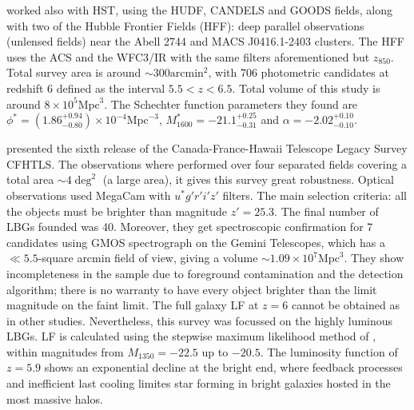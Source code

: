 \documentclass{emulateapj}
\begin{document}
\citet{finkelstein14} worked also with HST, using the HUDF, CANDELS and GOODS fields, 
along with two of the Hubble Frontier Fields (HFF): deep parallel observations (unlensed 
fields) near the Abell 2744 and MACS J0416.1-2403 clusters. The HFF uses the ACS and 
the WFC3/IR with the same filters aforementioned but $z_{850}$. Total survey area is around 
$\sim300\textrm{arcmin}^2$, with 706 photometric candidates at redshift 6 defined as the interval $5.5<z<6.5$. 
Total volume of this study is around $ 8 \times 10^5 \textrm{Mpc}^3$. The Schechter function parameters they found are $\phi^* =(1.86_{-0.80}^{+0.94}) \times 10 ^{-4}  \textrm{Mpc}^{-3} $, 
$M^*_{1600} = -21.1_{-0.31}^{+0.25}$ and $\alpha = -2.02_{-0.10}^{+0.10}$. 



\citet{willott13} presented the sixth release of the Canada-France-Hawaii 
Telescope Legacy Survey CFHTLS. The observations where performed over four 
separated fields covering a total area $\sim 4 \deg^2$ (a large area), it gives this 
survey great robustness. Optical observations used MegaCam  %
with $u^* g' r' i' z'$ filters. The main selection criteria: all the 
objects must be brighter than magnitude $z' = 25.3$. The final 
number of LBGs founded was 40. Moreover, they get spectroscopic confirmation 
for 7 candidates using GMOS spectrograph on the Gemini Telescopes, which 
has a $\ll 5.5$-square arcmin field of view, giving a volume $\sim 1.09 \times 10^7 \textrm{Mpc}^3$. 
They show incompleteness in the sample due to 
foreground contamination and the detection algorithm; there is no warranty to 
have every object brighter than the limit magnitude on the faint limit. The full 
galaxy LF at $z=6$ cannot be obtained as in other studies. Nevertheless, this survey 
was focussed on the highly luminous LBGs. LF is calculated using the stepwise 
maximum likelihood method of \citet{efstathiou88}, within 
magnitudes 
from $M_{1350} = -22.5$ up to $-20.5$. The luminosity function of $z=5.9$ shows 
an exponential decline at the bright end, where feedback processes and inefficient 
last cooling limites star forming in bright galaxies hosted in the most massive halos.
\end{document}

